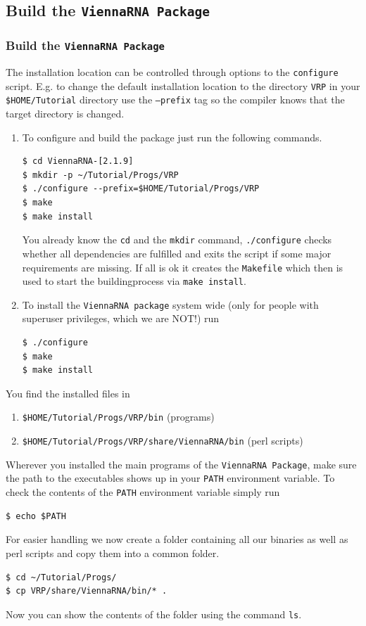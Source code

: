 \documentclass[a4paper]{article}
\newcommand{\frametitle}[1]{\subsubsection{#1}}
\begin{document}
\subsection{Build the \texttt{ViennaRNA Package}}
\frametitle{Build the \texttt{ViennaRNA Package}}
The installation location can be controlled through options to the
\texttt{configure} script. E.g. to change the default installation
location to the directory \texttt{VRP} in your \texttt{\$HOME/Tutorial} 
directory use the \texttt{--prefix} tag so the compiler knows that the 
target directory is changed.

\begin{enumerate}
\item To configure and build the package just run the following commands.
\begin{verbatim}
$ cd ViennaRNA-[2.1.9]
$ mkdir -p ~/Tutorial/Progs/VRP
$ ./configure --prefix=$HOME/Tutorial/Progs/VRP
$ make
$ make install
\end{verbatim}
You already know the \texttt{cd} and the \texttt{mkdir} command, \texttt{./configure} checks
whether all dependencies are fulfilled and exits the script if some major requirements are missing. 
If all is ok it creates the \texttt{Makefile} which then is used to start the buildingprocess via \texttt{make install}.
\item To install the \texttt{ViennaRNA package} system wide (only
for people with superuser privileges, which we are NOT!) run
\begin{verbatim}
$ ./configure
$ make
$ make install
\end{verbatim}
\end{enumerate}
\noindent
You find the installed files in 
\begin{enumerate}
\item \texttt{\$HOME/Tutorial/Progs/VRP/bin} (programs)
\item \texttt{\$HOME/Tutorial/Progs/VRP/share/ViennaRNA/bin} (perl scripts)
\end{enumerate}
Wherever you installed the main programs of the \texttt{ViennaRNA Package}, 
make sure the path to the executables shows up in your \texttt{PATH} 
environment variable. To check the contents of the \texttt{PATH} environment
variable simply run
\begin{verbatim}
$ echo $PATH
\end{verbatim}
For easier handling we now create a folder containing all our binaries as well as perl scripts and 
copy them into a common folder.
\begin{verbatim}
$ cd ~/Tutorial/Progs/
$ cp VRP/share/ViennaRNA/bin/* .
\end{verbatim}
Now you can show the contents of the folder using the command \texttt{ls}.
\end{document}
